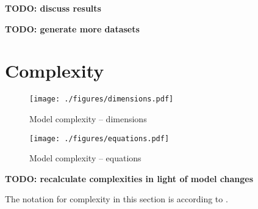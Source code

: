 \textbf{TODO: discuss results}

\textbf{TODO: generate more datasets}

\section{Complexity}\label{S.complexity}
\begin{figure}
    \centering
    \texttt{[image: ./figures/dimensions.pdf]}
    \caption{Model complexity -- dimensions}
    \label{fig.dims}
\end{figure}
\begin{figure}
    \centering
    \texttt{[image: ./figures/equations.pdf]}
    \caption{Model complexity -- equations}
    \label{fig.eqns}
\end{figure}

\textbf{TODO: recalculate complexities in light of model changes}

The notation for complexity in this section is according to \citet{Knuth:1976}.

